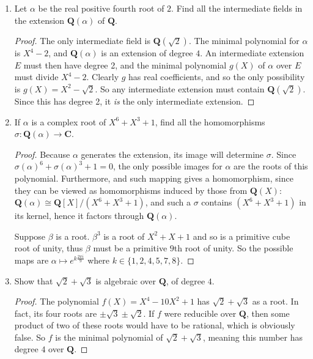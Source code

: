\documentclass[10pt]{article}
\newcommand{\Q}{\mathbf{Q}}
\newcommand{\C}{\mathbf{C}}
\begin{document}
\begin{enumerate}
\begin{proof}
\end{proof}

\item Let $\alpha$ be the real positive fourth root of $2$.  Find all the intermediate fields in the extension $\Q(\alpha)$ of $\Q$.

\begin{proof}
The only intermediate field is $\Q(\sqrt{2})$.  The minimal polynomial for $\alpha$ is $X^4 - 2$, and $\Q(\alpha)$ is an extension of degree $4$.  An intermediate extension $E$ must then have degree 2, and the minimal polynomial $g(X)$ of $\alpha$ over $E$ must divide $X^4 - 2$.  Clearly $g$ has real coefficients, and so the only possibility is $g(X) = X^2 - \sqrt{2}$.  So any intermediate extension must contain $\Q(\sqrt{2})$.  Since this has degree 2, it \emph{is} the only intermediate extension.
\end{proof}

\item If $\alpha$ is a complex root of $X^6 + X^3 + 1$, find all the homomorphisms $\sigma: \Q(\alpha) \rightarrow \C$.

\begin{proof}
Because $\alpha$ generates the extension, its image will determine $\sigma$.  Since $\sigma(\alpha)^6 + \sigma(\alpha)^3 + 1 = 0$, the only possible images for $\alpha$ are the roots of this polynomial.  Furthermore, and such mapping gives a homomorphism, since they can be viewed as homomorphisms induced by those from $\Q(X)$: $\Q(\alpha) \cong \Q[X] / (X^6 + X^3 + 1)$, and such a $\sigma$ contains $(X^6 + X^3 + 1)$ in its kernel, hence it factors through $\Q(\alpha)$.

Suppose $\beta$ is a root.  $\beta^3$ is a root of $X^2 + X + 1$ and so is a primitive cube root of unity, thus $\beta$ must be a primitive $9$th root of unity.  So the possible maps are $\alpha \mapsto e^{k\frac{2\pi i}{9}}$ where $k \in \{1,2,4,5,7,8\}$.
\end{proof}

\item Show that $\sqrt{2} + \sqrt{3}$ is algebraic over $\Q$, of degree $4$.

\begin{proof}
The polynomial $f(X) = X^4 - 10X^2 + 1$ has $\sqrt{2} + \sqrt{3}$ as a root.  In fact, its four roots are $\pm \sqrt{3} \pm \sqrt{2}$.  If $f$ were reducible over $\Q$, then some product of two of these roots would have to be rational, which is obviously false.  So $f$ is the minimal polynomial of $\sqrt{2} + \sqrt{3}$, meaning this number has degree $4$ over $\Q$.
\end{proof}


\end{enumerate}
\end{document}
